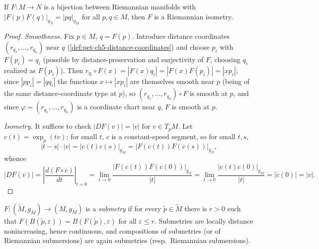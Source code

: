 \begin{theorem}
  \label{thm:pet-ch5-myers-steenrod-isometry}
  If $F:M\to N$ is a bijection between Riemannian manifolds with
  $|F(p)F(q)|_{g_N}=|pq|_{g_M}$ for all $p,q\in M$, then $F$ is a Riemannian
  isometry.
\end{theorem}
\begin{proof}
  \emph{Smoothness.} Fix $p\in M$, $q=F(p)$. Introduce distance coordinates
  $(r_{q_1},\dots,r_{q_n})$ near $q$ (\cref{def:pet-ch5-distance-coordinates}) and
  choose $p_i$ with $F(p_i)=q_i$ (possible by distance-preservation and surjectivity
  of $F$, choosing $q_i$ realized as $F(p_i)$). Then
  $r_{q_i}\circ F(x)=|F(x)q_i|=|F(x)F(p_i)|=|xp_i|$; since $|pp_i|=|qq_i|$ the
  functions $x\mapsto|xp_i|$ are themselves smooth near $p$ (being of the same
  distance-coordinate type at $p$), so $(r_{q_1},\dots,r_{q_n})\circ F$ is smooth at
  $p$, and since $\varphi=(r_{q_1},\dots,r_{q_n})$ is a coordinate chart near $q$,
  $F$ is smooth at $p$.

  \emph{Isometry.} It suffices to check $|DF(v)|=|v|$ for $v\in T_pM$. Let
  $c(t)=\exp_p(tv)$; for small $t$, $c$ is a constant-speed segment, so for small
  $t,s$,
  \[
    |t-s|\cdot|v|=|c(t)c(s)|_{g_M}=|F(c(t))F(c(s))|_{g_N},
  \]
  whence
  \[
    |DF(v)|=\left|\frac{d(F\circ c)}{dt}\right|_{t=0}
    =\lim_{t\to0}\frac{|F(c(t))F(c(0))|_{g_N}}{|t|}
    =\lim_{t\to0}\frac{|c(t)c(0)|_{g_M}}{|t|}=|\dot c(0)|=|v|.
  \]
\end{proof}

\begin{definition}[submetry]
  \label{def:pet-ch5-submetry}
  $F:(\tilde M,g_{\tilde M})\to(M,g_M)$ is a \emph{submetry} if for every
  $\tilde p\in\tilde M$ there is $r>0$ such that $F(B(\tilde p,\varepsilon))=
  B(F(\tilde p),\varepsilon)$ for all $\varepsilon\le r$. Submetries are locally
  distance nonincreasing, hence continuous, and compositions of submetries (or of
  Riemannian submersions) are again submetries (resp.\ Riemannian submersions).
\end{definition}

